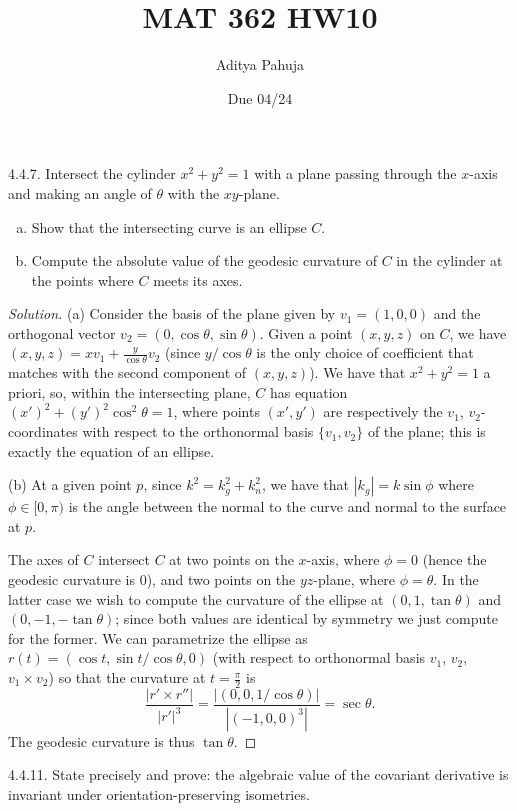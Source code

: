 \documentclass[10pt]{scrartcl}
\title{\vspace{-2em}MAT 362 HW10}
\author{\large Aditya Pahuja}
\date{\large Due 04/24}
\providecommand{\ii}{\item}
\newenvironment{soln}{\begin{proof}[Solution]}{\end{proof}}
\begin{document}
\maketitle

\begin{problem*}4.4.7.
	Intersect the cylinder $x^2+y^2=1$ with a plane passing through
	the $x$-axis and making an angle of $\theta$ with the $xy$-plane.
	\begin{enumerate}[(a)]
		\ii Show that the intersecting curve is an ellipse $C$.
		\ii Compute the absolute value of the geodesic curvature of $C$
		in the cylinder at the points where $C$ meets its axes.
	\end{enumerate}
\end{problem*}

\begin{soln}
	(a) Consider the basis of the plane given by $v_1 = (1,0,0)$
	and the orthogonal vector $v_2 = (0,\cos\theta,\sin\theta)$.
	Given a point $(x,y,z)$ on $C$, we have
	$(x,y,z) = xv_1 + \frac{y}{\cos\theta}v_2$
	(since $y/\cos\theta$ is the only choice of coefficient
	that matches with the second component of $(x,y,z)$).
	We have that $x^2 + y^2 =1$ a priori, so, within the intersecting plane,
	$C$ has equation $(x')^2 + (y')^2\cos^2\theta = 1$,
	where points $(x',y')$ are respectively the $v_1$, $v_2$-coordinates
	with respect to the orthonormal basis $\{v_1,v_2\}$ of the plane;
	this is exactly the equation of an ellipse.
	
	(b) At a given point $p$, since
	$k^2 = k_g^2 + k_n^2$, we have that $|k_g| = k\sin\phi$
	where $\phi\in[0,\pi)$ is the angle between the normal to the curve
	and normal to the surface at $p$.
	
	The axes of $C$ intersect $C$ at two points on the $x$-axis,
	where $\phi = 0$ (hence the geodesic curvature is $0$),
	and two points on the $yz$-plane, where $\phi = \theta$.
	In the latter case we wish to compute the curvature of the ellipse at
	$(0,1,\tan\theta)$ and $(0,-1,-\tan\theta)$; since both values
	are identical by symmetry we just compute for the former.
	We can parametrize the ellipse as $r(t) = (\cos t,\sin t/\cos\theta,0)$
	(with respect to orthonormal basis $v_1$, $v_2$, $v_1\times v_2$)
	so that the curvature at $t=\frac\pi2$ is
	\[\frac{|r'\times r''|}{|r'|^3} = \frac{|(0,0,1/\cos\theta)|}{|(-1,0,0)^3|}
	= \sec\theta.\]
	The geodesic curvature is thus $\tan\theta$.
\end{soln}

\begin{problem*}4.4.11.
	State precisely and prove: the algebraic value of the
	covariant derivative is invariant under orientation-preserving isometries.
\end{problem*}
\end{document}
